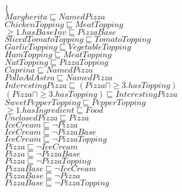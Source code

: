\documentclass[a4paper,10pt]{article}
\begin{document}
 \newcommand{\nxt}{{\ensuremath\raisebox{0.25ex}{\text{\scriptsize$\bigcirc$}}}}
\newcommand{\Rdiamond}{\Diamond_{\!F}}
\newcommand{\Rbox}{\Box_{\!F}}
\newcommand{\Rnext}{\nxt_{\!F}}
\newcommand{\Ldiamond}{\Diamond_{\!P}}
\newcommand{\Lbox}{\Box_{\!P}}
\newcommand{\Lnext}{\nxt_{\!P}}
\newcommand{\SVdiamond}{\mathop{\ooalign{$\Diamond$ \cr \kern0.5ex
    \raisebox{0.35ex}{\scalebox{0.7}{$*$}}} \kern-0.9ex}}
\newcommand{\SVbox}{\mathop{\ooalign{$\Box$ \cr \kern0.42ex
    \raisebox{0.3ex}{\scalebox{0.7}{$*$}}} \kern-0.9ex}}


 $\{$\\ 
$Margherita \sqsubseteq NamedPizza$\\ 
 $ChickenTopping \sqsubseteq MeatTopping$\\ 
 $ \ge 1.hasBaseInv \sqsubseteq PizzaBase$\\ 
 $SlicedTomatoTopping \sqsubseteq TomatoTopping$\\ 
 $GarlicTopping \sqsubseteq VegetableTopping$\\ 
 $HamTopping \sqsubseteq MeatTopping$\\ 
 $NutTopping \sqsubseteq PizzaTopping$\\ 
 $Caprina \sqsubseteq NamedPizza$\\ 
 $PolloAdAstra \sqsubseteq NamedPizza$\\ 
 $InterestingPizza \sqsubseteq  ( Pizza   \sqcap    \ge 3.hasTopping ) $\\ 
 $ ( Pizza   \sqcap    \ge 3.hasTopping )  \sqsubseteq InterestingPizza$\\ 
 $SweetPepperTopping \sqsubseteq PepperTopping$\\ 
 $ \ge 1.hasIngredient \sqsubseteq Food$\\ 
 $UnclosedPizza \sqsubseteq Pizza$\\ 
 $IceCream \sqsubseteq  \lnot Pizza$\\ 
 $IceCream \sqsubseteq  \lnot PizzaBase$\\ 
 $IceCream \sqsubseteq  \lnot PizzaTopping$\\ 
 $Pizza \sqsubseteq  \lnot IceCream$\\ 
 $Pizza \sqsubseteq  \lnot PizzaBase$\\ 
 $Pizza \sqsubseteq  \lnot PizzaTopping$\\ 
 $PizzaBase \sqsubseteq  \lnot IceCream$\\ 
 $PizzaBase \sqsubseteq  \lnot Pizza$\\ 
 $PizzaBase \sqsubseteq  \lnot PizzaTopping$\\ 
\end{document}
